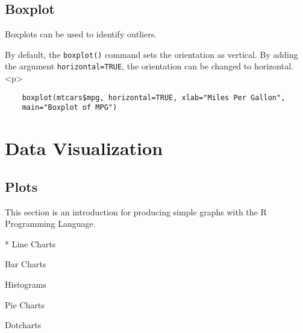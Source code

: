 \section{Boxplot}
Boxplots can be used to identify outliers.

By default, the \texttt{boxplot()} command sets the orientation as vertical. By adding the argument \texttt{horizontal=TRUE}, the orientation can be changed to horizontal.
<p>
\begin{framed}
	\begin{verbatim}
	boxplot(mtcars$mpg, horizontal=TRUE, xlab="Miles Per Gallon",
	main="Boxplot of MPG")
	\end{verbatim}
\end{framed}




\newpage


\chapter{Data Visualization}
\section{Plots}
This section is an introduction for producing simple graphs with
the R Programming Language.

*  Line Charts  \item Bar Charts \item Histograms \item Pie
	Charts \item Dotcharts





